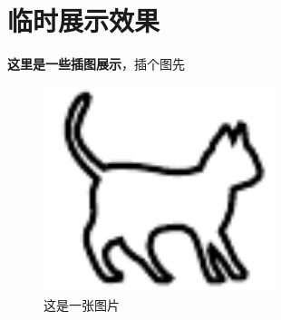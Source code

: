 \documentclass{cumcmthesis} %
\begin{document}
\section{临时展示效果}

\textbf{这里是一些插图展示}，插个图先

\begin{figure}[H]
    \centering
    \includegraphics[width= 0.6\textwidth]{img/cat.pdf}
    \caption{这是一张图片}
    \label{fig1}
\end{figure}
\end{document}
